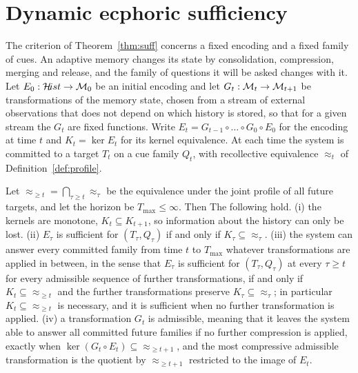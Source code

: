 \section*{Dynamic ecphoric sufficiency}

The criterion of Theorem~\ref{thm:suff} concerns a fixed encoding and a fixed family of cues. An adaptive memory changes its state by consolidation, compression, merging and release, and the family of questions it will be asked changes with it. Let $E_0:\mathcal{H}\!ist\to\mathcal{M}_0$ be an initial encoding and let $G_t:\mathcal{M}_t\to\mathcal{M}_{t+1}$ be transformations of the memory state, chosen from a stream of external observations that does not depend on which history is stored, so that for a given stream the $G_t$ are fixed functions. Write $E_t=G_{t-1}\circ\dots\circ G_0\circ E_0$ for the encoding at time $t$ and $K_t=\ker E_t$ for its kernel equivalence. At each time the system is committed to a target $T_t$ on a cue family $Q_t$, with recollective equivalence $\approx_t$ of Definition~\ref{def:profile}.

\begin{theorem}\label{thm:dynsuff}
Let $\approx_{\ge t}=\bigcap_{\tau\ge t}\approx_\tau$ be the equivalence under the joint profile of all future targets, and let the horizon be $T_{\max}\le\infty$. Then
The following hold. (i) the kernels are monotone, $K_t\subseteq K_{t+1}$, so information about the history can only be lost. (ii) $E_\tau$ is sufficient for $(T_\tau,Q_\tau)$ if and only if $K_\tau\subseteq{\approx_\tau}$. (iii) the system can answer every committed family from time $t$ to $T_{\max}$ whatever transformations are applied in between, in the sense that $E_\tau$ is sufficient for $(T_\tau,Q_\tau)$ at every $\tau\ge t$ for every admissible sequence of further transformations, if and only if $K_t\subseteq{\approx_{\ge t}}$ and the further transformations preserve $K_\tau\subseteq{\approx_\tau}$; in particular $K_t\subseteq{\approx_{\ge t}}$ is necessary, and it is sufficient when no further transformation is applied. (iv) a transformation $G_t$ is admissible, meaning that it leaves the system able to answer all committed future families if no further compression is applied, exactly when $\ker(G_t\circ E_t)\subseteq{\approx_{\ge t+1}}$, and the most compressive admissible transformation is the quotient by $\approx_{\ge t+1}$ restricted to the image of $E_t$.
\end{theorem}

